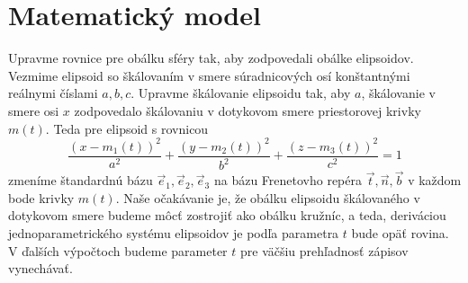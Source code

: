 \chapter{Matematický model}
\label{kap:matematicky_model}
Upravme rovnice pre obálku sféry tak, aby zodpovedali obálke elipsoidov. Vezmime elipsoid so škálovaním v smere súradnicových osí konštantnými reálnymi číslami $a,b,c.$ Upravme škálovanie elipsoidu tak, aby $a$, škálovanie v smere osi $x$ zodpovedalo škálovaniu v dotykovom smere priestorovej krivky $m(t).$
Teda pre elipsoid s rovnicou
\begin{equation*}
\frac{{(x - m_1(t))^2}}{{a^2}} + \frac{{(y - m_2(t))^2}}{{b^2}} + \frac{{(z - m_3(t))^2}}{{c^2}}= 1
\end{equation*} 
zmeníme štandardnú bázu $\vec{e}_1, \vec{e}_2, \vec{e}_3$ na bázu Frenetovho repéra $\vec{t}, \vec{n}, \vec{b}$ v každom bode krivky $m(t).$ Naše očakávanie je, že obálku  elipsoidu škálovaného v dotykovom smere budeme môcť zostrojiť ako obálku kružníc, a teda, deriváciou jednoparametrického systému elipsoidov je podľa parametra $t$ bude opäť rovina. V ďalších výpočtoch budeme parameter $t$ pre väčšiu prehľadnosť zápisov vynechávať.

